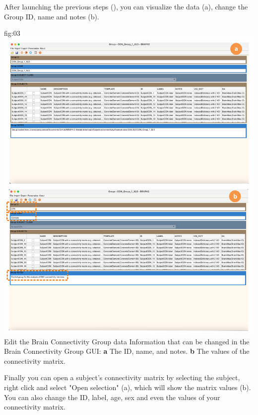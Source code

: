 \documentclass[justified]{tufte-handout}
\begin{document}
After launching the previous steps (), you can visualize the data (a), change the Group ID, name and notes (b). 

	{fig:03}
	{
	\includegraphics{fig03.png}
	}
	{Edit the Brain Connectivity Group data}
	{
	Information that can be changed in the Brain Connectivity Group GUI: 
	{\bf a} The ID, name, and notes.
	{\bf b} The values of the connectivity matrix.
	}

Finally you can open a subject's connectivity matrix by selecting the subject, right click and select "Open selection" (a), which will show the matrix values (b). You can also change the ID, label, age, sex and even the values of your connectivity matrix.
\end{document}
